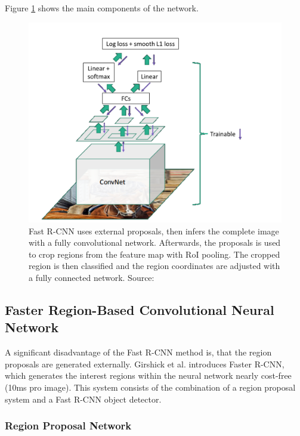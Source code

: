 Figure \ref{fig:fastrcnn} shows the main components of the network.
\bigbreak
\begin{figure}[h!]
	\centering
	\includegraphics[width=12cm]{images/mt/fast-rcnn.png}
	\caption{Fast R-CNN uses external proposals, then infers the complete image with a fully convolutional network. Afterwards, the proposals is used to crop regions from the feature map with RoI pooling. The cropped region is then classified and the region coordinates are adjusted with a fully connected network. Source: \cite{Girshick16}}
	\label{fig:fastrcnn}
\end{figure}
\bigbreak
\subsection{Faster Region-Based Convolutional Neural Network}\label{s:fasterrcnn}

A significant disadvantage of the Fast R-CNN method is, that the region proposals are generated externally. Girshick et al. \cite{NIPS2015_5638} introduces Faster R-CNN, which generates the interest regions within the neural network nearly cost-free (10ms pro image). This system consists of the combination of a region proposal system and a Fast R-CNN object detector.
\bigbreak
\subsubsection{Region Proposal Network}

